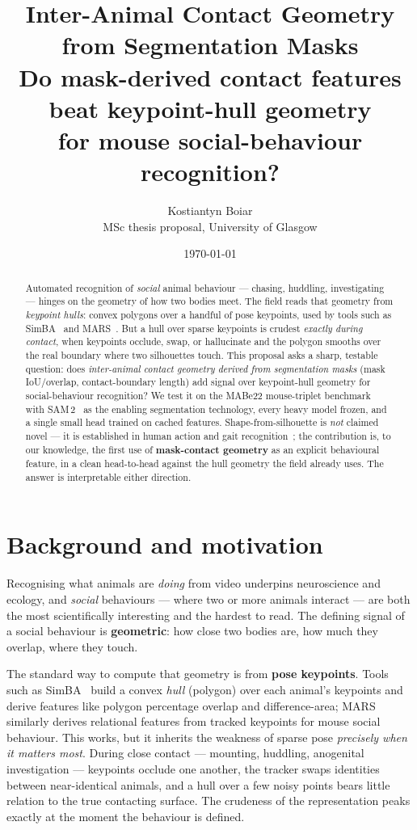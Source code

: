 \documentclass[11pt]{article}
\title{\textbf{Inter-Animal Contact Geometry from Segmentation Masks}\\[2pt]
\large Do mask-derived contact features beat keypoint-hull geometry\\ for mouse
social-behaviour recognition?}
\author{Kostiantyn Boiar\\[2pt]
\small MSc thesis proposal, University of Glasgow}
\date{\today}
\begin{document}
\maketitle

\begin{abstract}
\noindent Automated recognition of \emph{social} animal behaviour — chasing, huddling,
investigating — hinges on the geometry of how two bodies meet. The field reads that geometry
from \emph{keypoint hulls}: convex polygons over a handful of pose keypoints, used by tools
such as SimBA~\cite{simba} and MARS~\cite{mars}. But a hull over sparse keypoints is crudest
\emph{exactly during contact}, when keypoints occlude, swap, or hallucinate and the polygon
smooths over the real boundary where two silhouettes touch. This proposal asks a sharp,
testable question: does \emph{inter-animal contact geometry derived from segmentation masks}
(mask IoU/overlap, contact-boundary length) add signal over keypoint-hull geometry for
social-behaviour recognition? We test it on the MABe22 mouse-triplet
benchmark~\cite{mabe22} with SAM\,2~\cite{sam2} as the enabling segmentation technology, every
heavy model frozen, and a single small head trained on cached features. Shape-from-silhouette
is \emph{not} claimed novel — it is established in human action and gait
recognition~\cite{bobickdavis,spacetimeshapes,gaitsurvey}; the contribution is, to our
knowledge, the first use of \textbf{mask-contact geometry} as an explicit behavioural feature,
in a clean head-to-head against the hull geometry the field already uses. The answer is
interpretable either direction.
\end{abstract}

\section{Background and motivation}
Recognising what animals are \emph{doing} from video underpins neuroscience and ecology, and
\emph{social} behaviours — where two or more animals interact — are both the most scientifically
interesting and the hardest to read. The defining signal of a social behaviour is
\textbf{geometric}: how close two bodies are, how much they overlap, where they touch.

The standard way to compute that geometry is from \textbf{pose keypoints}. Tools such as
SimBA~\cite{simba} build a convex \emph{hull} (polygon) over each animal's keypoints and derive
features like polygon percentage overlap and difference-area; MARS~\cite{mars} similarly derives
relational features from tracked keypoints for mouse social behaviour. This works, but it inherits
the weakness of sparse pose \emph{precisely when it matters most}. During close contact —
mounting, huddling, anogenital investigation — keypoints occlude one another, the tracker swaps
identities between near-identical animals, and a hull over a few noisy points bears little
relation to the true contacting surface. The crudeness of the representation peaks exactly at the
moment the behaviour is defined.
\end{document}
